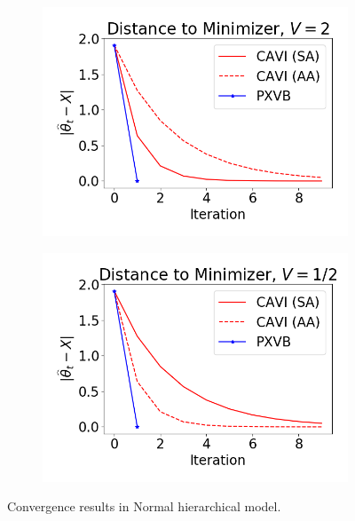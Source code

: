 \documentclass{article}
\begin{document}
\begin{figure}[h!]
\centering
    \begin{subfigure}[t]{0.35\textwidth}
        \includegraphics[width=\textwidth]{Probit_real/nm_convergence1.png}
    \end{subfigure}
          \begin{subfigure}[t]{0.35\textwidth}
        \includegraphics[width=\textwidth]{Probit_real/nm_convergence2.png}
    \end{subfigure}
    \caption{Convergence results in Normal hierarchical model.}
    \label{nm_case}
\end{figure}


\newpage
\end{document}
